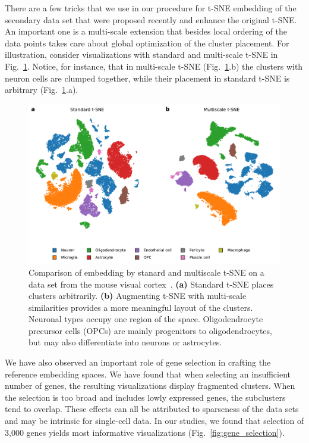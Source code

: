 \documentclass[runningheads]{llncs}
\begin{document}
There are a few tricks that we use in our procedure for t-SNE embedding of the
secondary data set that were proposed recently and enhance the original t-SNE.
An important one is a multi-scale extension that besides local ordering of the
data points takes care about global optimization of the cluster placement. For
illustration, consider visualizations with standard and multi-scale t-SNE in
Fig.~\ref{fig:multiscale}. Notice, for instance, that in multi-scale t-SNE
(Fig.~\ref{fig:multiscale}.b) the clusters with neuron cells are clumped
together, while their placement in standard t-SNE is arbitrary
(Fig.~\ref{fig:multiscale}.a).


\begin{figure}[htbp]
\includegraphics[width=\textwidth]{figures/hrvatin_multiscale_tsne.pdf}
\caption{Comparison of embedding by stanard and multiscale t-SNE on a data set
from the mouse visual cortex~\cite{hrvatin2018}. {\bf (a)} Standard t-SNE
places clusters arbitrarily. {\bf (b)} Augmenting t-SNE with multi-scale
similarities provides a more meaningful layout of the clusters. Neuronal types
occupy one region of the space. Oligodendrocyte precursor cells (OPCs) are
mainly progenitors to oligodendrocytes, but may also differentiate into neurons
or astrocytes.} \label{fig:multiscale}
\end{figure}

We have also observed an important role of gene selection in crafting the
reference embedding spaces. We have found that when selecting an insufficient
number of genes, the resulting visualizations display fragmented clusters. When
the selection is too broad and includes lowly expressed genes, the subclusters
tend to overlap. These effects can all be attributed to sparseness of the data
sets and may be intrinsic for single-cell data. In our studies, we found that
selection of 3,000 genes yields most informative visualizations
(Fig.~\ref{fig:gene_selection}).
\end{document}

